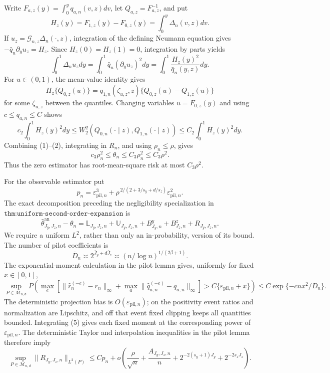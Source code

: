 Write \(F_{a,z}(y)=\int_0^yq_{a,n}(v,z)dv\), let \(Q_{a,z}=F_{a,z}^{-1}\), and put
\[
H_z(y)=F_{1,z}(y)-F_{0,z}(y)=\int_0^y\Delta_n(v,z)dv.
\]
If \(u_z=\mathcal G_{n,z}\Delta_n(\cdot,z)\), integration of the defining Neumann equation gives \(-\bar q_n\partial_yu_z=H_z\). Since \(H_z(0)=H_z(1)=0\), integration by parts yields
\[
\int_0^1\Delta_nu_zdy
=\int_0^1\bar q_n(\partial_yu_z)^2dy
=\int_0^1\frac{H_z(y)^2}{\bar q_n(y,z)}dy.            \tag{1}
\]
For \(u\in(0,1)\), the mean-value identity gives
\[
H_z\{Q_{0,z}(u)\}
=q_{1,n}(\zeta_{u,z},z)\{Q_{0,z}(u)-Q_{1,z}(u)\}
\]
for some \(\zeta_{u,z}\) between the quantiles. Changing variables \(u=F_{0,z}(y)\) and using \(c\le q_{a,n}\le C\) shows
\[
c_2\int_0^1H_z(y)^2dy
\le W_2^2(Q_{0,n}(\cdot\mid z),Q_{1,n}(\cdot\mid z))
\le C_2\int_0^1H_z(y)^2dy.                            \tag{2}
\]
Combining (1)--(2), integrating in \(R_n\), and using \(\rho_n\le\rho\), gives
\[
c_3\rho_n^2\le\theta_n\le C_3\rho_n^2\le C_3\rho^2.  \tag{3}
\]
Thus the zero estimator has root-mean-square risk at most \(C_3\rho^2\).

For the observable estimator put
\[
p_n=\varepsilon_{\mathrm{pil},n}^3+
\rho^{\,2/(2+3/s_y+d/s_z)}\varepsilon_{\mathrm{pil},n}^2.
\]
The exact decomposition preceding the negligibility specialization in \(\texttt{thm:uniform-second-order-expansion}\) is
\[
\widehat\theta^{\mathrm{an}}_{J_y,J_z,n}-\theta_n
=\mathbb L_{J_y,J_z,n}+\mathbb U_{J_y,J_z,n}
+B^y_{J_y,n}+B^z_{J_z,n}+R_{J_y,J_z,n}.              \tag{4}
\]
We require a uniform \(L^2\), rather than only an in-probability, version of its bound. The number of pilot coefficients is
\[
\overline D_n\asymp2^{\bar J_y+d\bar J_z}
\asymp(n/\log n)^{1/(2\beta+1)}.
\]
The exponential-moment calculation in the pilot lemma gives, uniformly for fixed \(x\in[0,1]\),
\[
\sup_{P\in\mathcal M_{n,d}}
P\!\left(\max_e\left[\|\widehat r_n^{(-e)}-r_n\|_\infty+
\max_a\|\widehat q_{a,n}^{(-e)}-q_{a,n}\|_\infty\right]
>C\{\varepsilon_{\mathrm{pil},n}+x\}\right)
\le C\exp\{-cnx^2/\overline D_n\}.                    \tag{5}
\]
The deterministic projection bias is \(O(\varepsilon_{\mathrm{pil},n})\); on the positivity event ratios and normalization are Lipschitz, and off that event fixed clipping keeps all quantities bounded. Integrating (5) gives each fixed moment at the corresponding power of \(\varepsilon_{\mathrm{pil},n}\). The deterministic Taylor and interpolation inequalities in the pilot lemma therefore imply
\[
\sup_{P\in\mathcal M_{n,d}}\|R_{J_y,J_z,n}\|_{L^2(P)}
\le Cp_n+o\!\left(\frac{\rho}{\sqrt n}+\frac{A_{J_y,J_z,n}}n
+2^{-2(s_y+1)J_y}+2^{-2s_zJ_z}\right).               \tag{6}
\]

